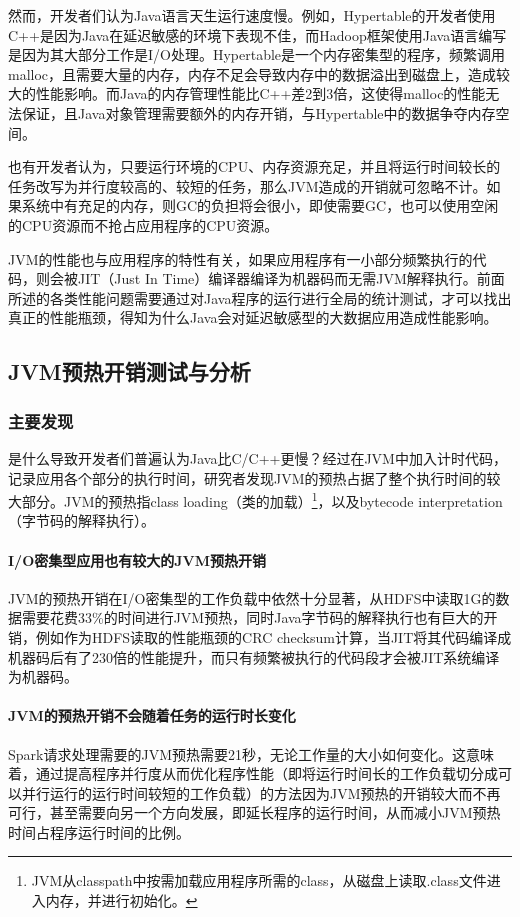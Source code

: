 \documentclass[lang=cn,12pt,a4paper,cite=authoryear]{elegantpaper}
\begin{document}
\begin{figure*}[!htp]
然而，开发者们认为Java语言天生运行速度慢。例如，Hypertable\cite{DBLP:conf/aaai/RiosJ11}的开发者使用C++是因为Java在延迟敏感的环境下表现不佳，而Hadoop框架使用Java语言编写是因为其大部分工作是I/O处理。Hypertable是一个内存密集型的程序，频繁调用malloc，且需要大量的内存，内存不足会导致内存中的数据溢出到磁盘上，造成较大的性能影响。而Java的内存管理性能比C++差2到3倍，这使得malloc的性能无法保证，且Java对象管理需要额外的内存开销，与Hypertable中的数据争夺内存空间。

也有开发者认为，只要运行环境的CPU、内存资源充足，并且将运行时间较长的任务改写为并行度较高的、较短的任务，那么JVM造成的开销就可忽略不计。如果系统中有充足的内存，则GC的负担将会很小，即使需要GC，也可以使用空闲的CPU资源而不抢占应用程序的CPU资源。

JVM的性能也与应用程序的特性有关，如果应用程序有一小部分频繁执行的代码，则会被JIT（Just In Time）编译器编译为机器码而无需JVM解释执行。前面所述的各类性能问题需要通过对Java程序的运行进行全局的统计测试，才可以找出真正的性能瓶颈，得知为什么Java会对延迟敏感型的大数据应用造成性能影响。

\subsection{JVM预热开销测试与分析}
\subsubsection{主要发现}
是什么导致开发者们普遍认为Java比C/C++更慢？经过在JVM中加入计时代码，记录应用各个部分的执行时间，研究者发现JVM的预热占据了整个执行时间的较大部分。JVM的预热指class loading\cite{loading}（类的加载）\footnote{JVM从classpath中按需加载应用程序所需的class，从磁盘上读取.class文件进入内存，并进行初始化。}，以及bytecode interpretation\cite{interpreted}（字节码的解释执行）。

\paragraph{I/O密集型应用也有较大的JVM预热开销} JVM的预热开销在I/O密集型的工作负载中依然十分显著，从HDFS中读取1G的数据需要花费33\%的时间进行JVM预热，同时Java字节码的解释执行也有巨大的开销，例如作为HDFS读取的性能瓶颈的CRC checksum计算，当JIT将其代码编译成机器码后有了230倍的性能提升，而只有频繁被执行的代码段才会被JIT系统编译为机器码。

\paragraph{JVM的预热开销不会随着任务的运行时长变化} Spark请求处理需要的JVM预热需要21秒，无论工作量的大小如何变化。这意味着，通过提高程序并行度从而优化程序性能（即将运行时间长的工作负载切分成可以并行运行的运行时间较短的工作负载）的方法因为JVM预热的开销较大而不再可行，甚至需要向另一个方向发展，即延长程序的运行时间，从而减小JVM预热时间占程序运行时间的比例。


\end{figure*}
\end{document}
